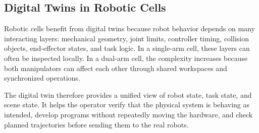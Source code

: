 \subsection{Digital Twins in Robotic Cells}

Robotic cells benefit from digital twins because robot behavior depends on many interacting layers: mechanical geometry, joint limits, controller timing, collision objects, end-effector states, and task logic. In a single-arm cell, these layers can often be inspected locally. In a dual-arm cell, the complexity increases because both manipulators can affect each other through shared workspaces and synchronized operations.

The digital twin therefore provides a unified view of robot state, task state, and scene state. It helps the operator verify that the physical system is behaving as intended, develop programs without repeatedly moving the hardware, and check planned trajectories before sending them to the real robots.
